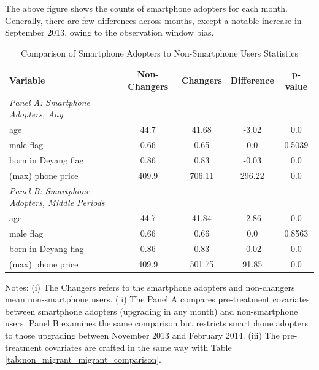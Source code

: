 The above figure shows the counts of smartphone adopters for each month. Generally, there are few differences across months, except a notable increase in September 2013, owing to the observation window bias.

\begin{table}[htbp]
\vspace{0.5cm}
\renewcommand{\arraystretch}{1.6}
\setlength{\tabcolsep}{1.1mm}{}
\centering
\small
\caption{Comparison of Smartphone Adopters to Non-Smartphone Users Statistics}
\begin{tabular}{lcccc} \hline
Variable & Non-Changers & Changers & Difference & p-value \\ \hline
\textit{Panel A: Smartphone Adopters, Any} \\
age & 44.7 & 41.68 & -3.02 & 0.0 \\
male flag & 0.66 & 0.65 & 0.0 & 0.5039 \\
born in Deyang flag & 0.86 & 0.83 & -0.03 & 0.0 \\
(max) phone price & 409.9 & 706.11 & 296.22 & 0.0 \\ \hline

\textit{Panel B: Smartphone Adopters, Middle Periods} \\
age & 44.7 & 41.84 & -2.86 & 0.0 \\
male flag & 0.66 & 0.66 & 0.0 & 0.8563 \\
born in Deyang flag & 0.86 & 0.83 & -0.02 & 0.0 \\
(max) phone price & 409.9 & 501.75 & 91.85 & 0.0 \\ \hline

\end{tabular}
\label{tab:non_changer_changer_comparison}%
\end{table}%

\vspace{-2em}
\begin{singlespace}
\begin{footnotesize}
\noindent Notes: (i) The Changers refers to the smartphone adopters and non-changers mean non-smartphone users. (ii) The Panel A compares pre-treatment covariates between smartphone adopters (upgrading in any month) and non-smartphone users. Panel B examines the same comparison but restricts smartphone adopters to those upgrading between November 2013 and February 2014. (iii) The pre-treatment covariates are crafted in the same way with Table \ref{tab:non_migrant_migrant_comparison}.
\end{footnotesize}
\end{singlespace}


